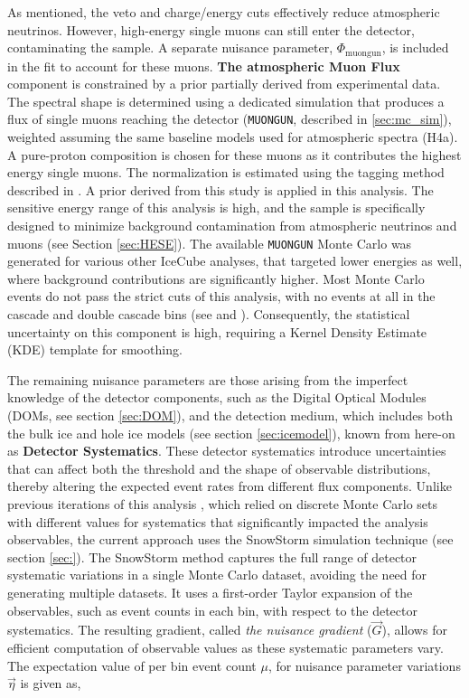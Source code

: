 As mentioned, the veto and charge/energy cuts effectively reduce atmospheric neutrinos. However, high-energy single muons can still enter the detector, contaminating the sample. A separate nuisance parameter, $\Phi_{\mathrm{muongun}}$, is included in the fit to account for these muons. \textbf{The atmospheric Muon Flux} component is constrained by a prior partially derived from experimental data. The spectral shape is determined using a dedicated simulation that produces a flux of single muons reaching the detector (\texttt{MUONGUN}, described in \ref{sec:mc_sim}), weighted assuming the same baseline models used for atmospheric spectra (H4a). A pure-proton composition is chosen for these muons as it contributes the highest energy single muons. The normalization is estimated using the tagging method described in \cite{HESE7_sample}. A prior derived from this study is applied in this analysis. The sensitive energy range of this analysis is high, and the sample is specifically designed to minimize background contamination from atmospheric neutrinos and muons (see Section \ref{sec:HESE}). The available \texttt{MUONGUN} Monte Carlo was generated for various other IceCube analyses, that targeted lower energies as well, where background contributions are significantly higher. Most Monte Carlo events do not pass the strict cuts of this analysis, with no events at all in the cascade and double cascade bins (see  and ). Consequently, the statistical uncertainty on this component is high, requiring a Kernel Density Estimate (KDE) template for smoothing.

The remaining nuisance parameters are those arising from the imperfect knowledge of the detector components, such as the Digital Optical Modules (DOMs, see section \ref{sec:DOM}), and the detection medium, which includes both the bulk ice and hole ice models (see section \ref{sec:icemodel}), known from here-on as \textbf{Detector Systematics}. These detector systematics introduce uncertainties that can affect both the threshold and the shape of observable distributions, thereby altering the expected event rates from different flux components. Unlike previous iterations of this analysis , which relied on discrete Monte Carlo sets with different values for systematics that significantly impacted the analysis observables, the current approach uses the SnowStorm simulation technique (see section \ref{sec:}). The SnowStorm method  captures the full range of detector systematic variations in a single Monte Carlo dataset, avoiding the need for generating multiple datasets. It uses a first-order Taylor expansion of the observables, such as event counts in each bin, with respect to the detector systematics. The resulting gradient, called \emph{the nuisance gradient} ($\vec{G}$), allows for efficient computation of observable values as these systematic parameters vary. The expectation value of per bin event count $\mu$, for nuisance parameter variations $\vec{\eta}$ is given as,

